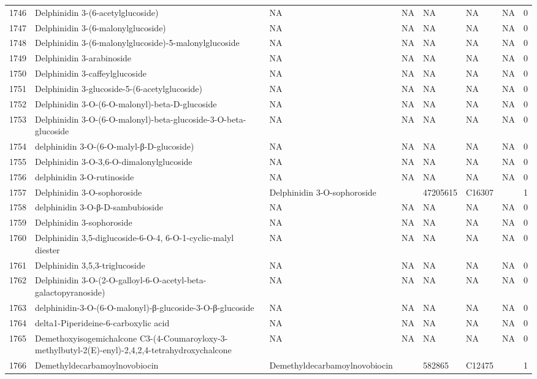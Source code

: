 \documentclass[a4paper]{article}
\begin{document}
\begin{longtable}{rlllllll}
  1746 & Delphinidin 3-(6-acetylglucoside) & NA & NA & NA & NA & NA & 0 \\ 
  1747 & Delphinidin 3-(6-malonylglucoside) & NA & NA & NA & NA & NA & 0 \\ 
  1748 & Delphinidin 3-(6-malonylglucoside)-5-malonylglucoside & NA & NA & NA & NA & NA & 0 \\ 
  1749 & Delphinidin 3-arabinoside & NA & NA & NA & NA & NA & 0 \\ 
  1750 & Delphinidin 3-caffeylglucoside & NA & NA & NA & NA & NA & 0 \\ 
  1751 & Delphinidin 3-glucoside-5-(6-acetylglucoside) & NA & NA & NA & NA & NA & 0 \\ 
  1752 & Delphinidin 3-O-(6-O-malonyl)-beta-D-glucoside & NA & NA & NA & NA & NA & 0 \\ 
  1753 & Delphinidin 3-O-(6-O-malonyl)-beta-glucoside-3-O-beta-glucoside & NA & NA & NA & NA & NA & 0 \\ 
  1754 & delphinidin 3-O-(6-O-malyl-β-D-glucoside) & NA & NA & NA & NA & NA & 0 \\ 
  1755 & Delphinidin 3-O-3,6-O-dimalonylglucoside & NA & NA & NA & NA & NA & 0 \\ 
  1756 & delphinidin 3-O-rutinoside & NA & NA & NA & NA & NA & 0 \\ 
  1757 & Delphinidin 3-O-sophoroside & Delphinidin 3-O-sophoroside &  & 47205615 & C16307 &  & 1 \\ 
  1758 & delphinidin 3-O-β-D-sambubioside & NA & NA & NA & NA & NA & 0 \\ 
  1759 & Delphinidin 3-sophoroside & NA & NA & NA & NA & NA & 0 \\ 
  1760 & Delphinidin 3,5-diglucoside-6-O-4, 6-O-1-cyclic-malyl diester & NA & NA & NA & NA & NA & 0 \\ 
  1761 & Delphinidin 3,5,3-triglucoside & NA & NA & NA & NA & NA & 0 \\ 
  1762 & Delphinidin 3-O-(2-O-galloyl-6-O-acetyl-beta-galactopyranoside) & NA & NA & NA & NA & NA & 0 \\ 
  1763 & delphinidin-3-O-(6-O-malonyl)-β-glucoside-3-O-β-glucoside & NA & NA & NA & NA & NA & 0 \\ 
  1764 & delta1-Piperideine-6-carboxylic acid & NA & NA & NA & NA & NA & 0 \\ 
  1765 & Demethoxyisogemichalcone C3-(4-Coumaroyloxy-3-methylbutyl-2(E)-enyl)-2,4,2,4-tetrahydroxychalcone & NA & NA & NA & NA & NA & 0 \\ 
  1766 & Demethyldecarbamoylnovobiocin & Demethyldecarbamoylnovobiocin &  & 582865 & C12475 &  & 1 \\ 

\end{longtable}
\end{document}
